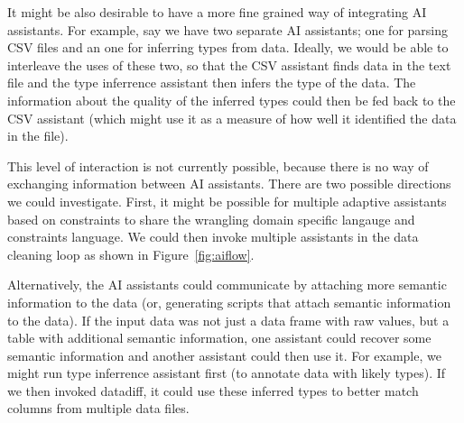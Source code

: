 \documentclass{article}
\begin{document}
It might be also desirable to have a more fine grained way of integrating AI assistants. For
example, say we have two separate AI assistants; one for parsing CSV files and an one for inferring
types from data. Ideally, we would be able to interleave the uses of these two, so that the CSV
assistant finds data in the text file and the type inferrence assistant then infers the type
of the data. The information about the quality of the inferred types could then be fed back to the
CSV assistant (which might use it as a measure of how well it identified the data in the file).

This level of interaction is not currently possible, because there is no way of exchanging 
information between AI assistants. There are two possible directions we could investigate. 
First, it might be possible for multiple adaptive assistants based on constraints to share the 
wrangling domain specific langauge and constraints language. We could then invoke multiple
assistants in the data cleaning loop as shown in Figure~\ref{fig:aiflow}. 

Alternatively, the AI assistants could communicate by attaching more semantic information to 
the data (or, generating scripts that attach semantic information to the data). If the input 
data was not just a data frame with raw values, but a table with additional semantic information,
one assistant could recover some semantic information and another assistant could then use it.
For example, we might run type inferrence assistant first (to annotate data with likely types).
If we then invoked datadiff, it could use these inferred types to better match columns from 
multiple data files.
\end{document}
